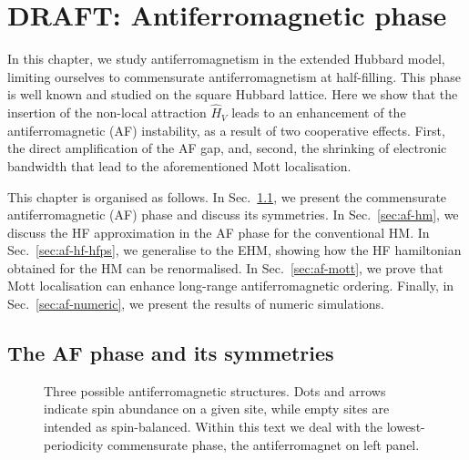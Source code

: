 \def\GraphicsFolder{chapters/antiferromagnetic-instability/pictures}
\chapter{DRAFT: Antiferromagnetic phase}\label{chap:af}

In this chapter, we study antiferromagnetism in the extended Hubbard model, limiting ourselves to commensurate antiferromagnetism at half-filling. This phase is well known and studied on the square Hubbard lattice. Here we show that the insertion of the non-local attraction $\hat H_V$ leads to an enhancement of the antiferromagnetic (AF) instability, as a result of two cooperative effects. First, the direct amplification of the AF gap, and, second, the shrinking of electronic bandwidth that lead to the aforementioned Mott localisation.

This chapter is organised as follows. In Sec.~\ref{sec:af-phase-theory}, we present the commensurate antiferromagnetic (AF) phase and discuss its symmetries. In Sec.~\ref{sec:af-hm}, we discuss the HF approximation in the AF phase for the conventional HM. In Sec.~\ref{sec:af-hf-hfps}, we generalise to the EHM, showing how the HF hamiltonian obtained for the HM can be renormalised. In Sec.~\ref{sec:af-mott}, we prove that Mott localisation can enhance long-range antiferromagnetic ordering. Finally, in Sec.~\ref{sec:af-numeric}, we present the results of numeric simulations.

\section{The AF phase and its symmetries}\label{sec:af-phase-theory}

\begin{figure}
	\centering
	
	\caption{Three possible antiferromagnetic structures. Dots and arrows indicate spin abundance on a given site, while empty sites are intended as spin-balanced. Within this text we deal with the lowest-periodicity commensurate phase, the antiferromagnet on left panel.}
	\label{fig:antiferromagnets}
\end{figure}

